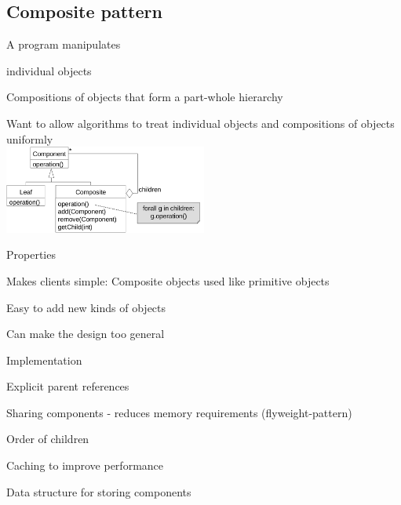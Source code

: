 \documentclass[10pt]{article}
\begin{document}
\subsection{Composite pattern}
\enumstart
	\item A program manipulates
	\enumstart
		\item individual objects
		\item Compositions of objects that form a part-whole hierarchy
	\enumend
	\item Want to allow algorithms to treat individual objects and compositions of objects uniformly
	\\ \includegraphics[width=0.5\textwidth]{composite_pattern.png}
	\item Properties
	\enumstart
		\item Makes clients simple: Composite objects used like primitive objects
		\item Easy to add new kinds of objects
		\item Can make the design too general
	\enumend
	\item Implementation
	\enumstart
		\item Explicit parent references
		\item Sharing components - reduces memory requirements (flyweight-pattern)
		\item Order of children
		\item Caching to improve performance
		\item Data structure for storing components
	\enumend
\enumend
\end{document}
